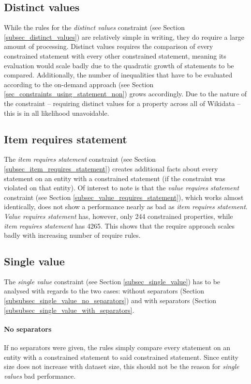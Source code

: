 \documentclass[hyperref,bachelorofscience,fleqn]{cgvpub}
\begin{document}
\subsection{Distinct values}
While the rules for the \emph{distinct values} constraint (see Section \ref{subsec_distinct_values}) are relatively simple in writing, they do require a large amount of processing. Distinct values requires the comparison of every constrained statement with every other constrained statement, meaning its evaluation would scale badly due to the quadratic growth of statements to be compared. Additionally, the number of inequalities that have to be evaluated according to the on-demand approach (see Section \ref{sec_constraints_using_statement_non}) grows accordingly. Due to the nature of the constraint -- requiring distinct values for a property across all of Wikidata -- this is in all likelihood unavoidable.

\subsection{Item requires statement}\label{subsec_findings_item_requires_statement}
The \emph{item requires statement} constraint (see Section \ref{subsec_item_requires_statement}) creates additional facts about every statement on an entity with a constrained statement (if the constraint was violated on that entity). Of interest to note is that the \emph{value requires statement} constraint (see Section \ref{subsec_value_requires_statement}), which works almost identically, does not show a performance nearly as bad as \emph{item requires statement}. \emph{Value requires statement} has, however, only 244 constrained properties, while \emph{item requires statement} has 4265. This shows that the require approach scales badly with increasing number of require rules.

\subsection{Single value}
The \emph{single value} constraint (see Section \ref{subsec_single_value}) has to be analysed with regards to the two cases: without separators (Section \ref{subsubsec_single_value_no_separators}) and with separators (Section \ref{subsubsec_single_value_with_separators}.

\paragraph{No separators}
If no separators were given, the rules simply compare every statement on an entity with a constrained statement to said constrained statement. Since entity size does not increase with dataset size, this should not be the reason for \emph{single values} bad performance.
\end{document}
